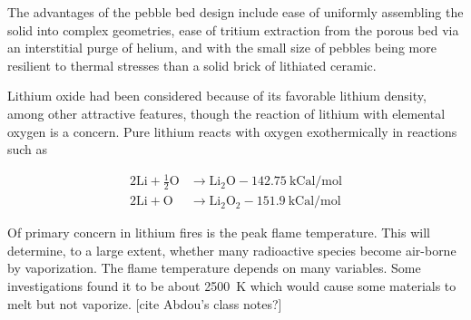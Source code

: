 The advantages of the pebble bed design include ease of uniformly assembling the solid into complex geometries, ease of tritium extraction from the porous bed via an interstitial purge of helium, and with the small size of pebbles being more resilient to thermal stresses than a solid brick of lithiated ceramic.\cite{Casadio2004} 


Lithium oxide had been considered because of its favorable lithium density, among other attractive features, though the reaction of lithium with elemental oxygen is a concern. Pure lithium reacts with oxygen exothermically in reactions such as

\begin{subequations}
\begin{align}
	2\mathrm{Li} + \frac{1}{2}\mathrm{O} &\rightarrow \mathrm{Li}_2\mathrm{O} - 142.75\ \text{kCal/mol}\\
	2\mathrm{Li} + \mathrm{O} &\rightarrow \mathrm{Li}_2\mathrm{O}_2 - 151.9\ \text{kCal/mol}
\end{align}
\end{subequations}

Of primary concern in lithium fires is the peak flame temperature. This will determine, to a large extent, whether many radioactive species become air-borne by vaporization. The flame temperature depends on many variables. Some investigations found it to be about 2500~K which would cause some materials to melt but not vaporize. [cite Abdou's class notes?]
